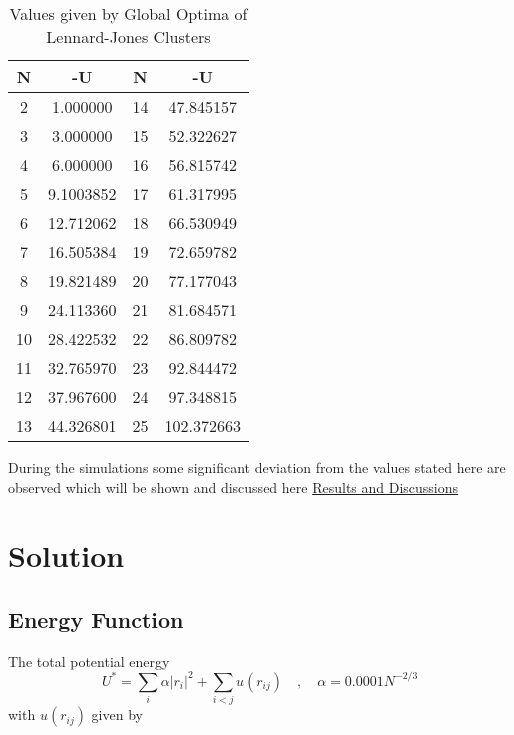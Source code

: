 \documentclass{scrartcl}
\begin{document}
\begin{table} [h]
    \centering
    \label{tab:table1}
 
    \begin{tabular}{|c|c|c|c|}
    \hline
   N      &  -U       &   N    &  -U \\
   \hline
    2     &  1.000000  &   14  &  47.845157\\
    3     &  3.000000  &   15  &  52.322627\\
    4     &  6.000000  &   16  &  56.815742\\
    5     &  9.1003852 &   17  &  61.317995\\
    6     &  12.712062 &   18  &  66.530949\\
    7     &  16.505384 &   19  &  72.659782\\
    8     &  19.821489 &   20  &  77.177043\\
    9     &  24.113360 &   21  &  81.684571\\
    10    &  28.422532 &   22  &  86.809782\\
    11    &  32.765970 &   23  &  92.844472\\
    12    &  37.967600 &   24  &  97.348815\\
    13    &  44.326801 &   25  &  102.372663\\      
    \hline           
    \end{tabular}
    \caption{Values given by Global Optima of Lennard-Jones Clusters} \cite{GOLJC}
\end{table}

\par During the simulations some significant deviation from the values stated here are observed which will be shown and discussed here \hyperref[sec:Results and Discussions]{Results and Discussions}

\newpage
\section{Solution}
\label{sec:Solution}
\subsection{Energy Function}
\par The total potential energy 
\begin{equation}
    U^{*} = \sum_{i} \alpha|r_{i}|^{2} + \sum_{i<j}u(r_{ij}) \quad , \quad
    \alpha = 0.0001N^{-2/3}
\end{equation}
    with $u(r_{ij})$ given by
\end{document}
